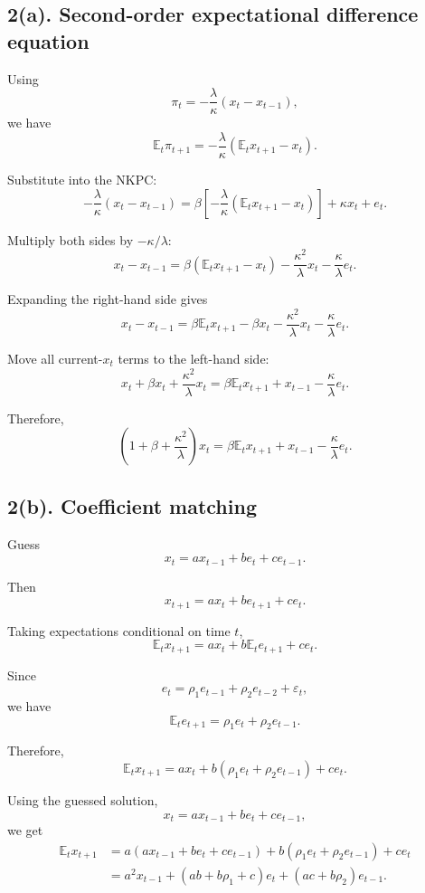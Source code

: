 \documentclass[12pt]{article}
\begin{document}
\subsection*{2(a). Second-order expectational difference equation}

Using
\[
\pi_t=-\frac{\lambda}{\kappa}(x_t-x_{t-1}),
\]
we have
\[
\mathbb{E}_t\pi_{t+1}
=
-\frac{\lambda}{\kappa}
\left(
\mathbb{E}_t x_{t+1}-x_t
\right).
\]

Substitute into the NKPC:
\[
-\frac{\lambda}{\kappa}(x_t-x_{t-1})
=
\beta
\left[
-\frac{\lambda}{\kappa}
\left(
\mathbb{E}_t x_{t+1}-x_t
\right)
\right]
+
\kappa x_t
+
e_t.
\]

Multiply both sides by $-\kappa/\lambda$:
\[
x_t-x_{t-1}
=
\beta
\left(
\mathbb{E}_t x_{t+1}-x_t
\right)
-
\frac{\kappa^2}{\lambda}x_t
-
\frac{\kappa}{\lambda}e_t.
\]

Expanding the right-hand side gives
\[
x_t-x_{t-1}
=
\beta\mathbb{E}_t x_{t+1}
-
\beta x_t
-
\frac{\kappa^2}{\lambda}x_t
-
\frac{\kappa}{\lambda}e_t.
\]

Move all current-$x_t$ terms to the left-hand side:
\[
x_t+\beta x_t+\frac{\kappa^2}{\lambda}x_t
=
\beta\mathbb{E}_t x_{t+1}
+
x_{t-1}
-
\frac{\kappa}{\lambda}e_t.
\]

Therefore,
\[
\boxed{
\left(
1+\beta+\frac{\kappa^2}{\lambda}
\right)x_t
=
\beta\mathbb{E}_t x_{t+1}
+
x_{t-1}
-
\frac{\kappa}{\lambda}e_t.
}
\]

\subsection*{2(b). Coefficient matching}

Guess
\[
x_t=a x_{t-1}+b e_t+c e_{t-1}.
\]

Then
\[
x_{t+1}
=
a x_t+b e_{t+1}+c e_t.
\]

Taking expectations conditional on time $t$,
\[
\mathbb{E}_t x_{t+1}
=
a x_t+b\mathbb{E}_t e_{t+1}+c e_t.
\]

Since
\[
e_t=\rho_1 e_{t-1}+\rho_2 e_{t-2}+\varepsilon_t,
\]
we have
\[
\mathbb{E}_t e_{t+1}
=
\rho_1 e_t+\rho_2 e_{t-1}.
\]

Therefore,
\[
\mathbb{E}_t x_{t+1}
=
a x_t
+
b(\rho_1 e_t+\rho_2 e_{t-1})
+
c e_t.
\]

Using the guessed solution,
\[
x_t=a x_{t-1}+b e_t+c e_{t-1},
\]
we get
\[
\begin{aligned}
\mathbb{E}_t x_{t+1}
&=
a(a x_{t-1}+b e_t+c e_{t-1})
+
b(\rho_1 e_t+\rho_2 e_{t-1})
+
c e_t \\
&=
a^2x_{t-1}
+
(ab+b\rho_1+c)e_t
+
(ac+b\rho_2)e_{t-1}.
\end{aligned}
\]
\end{document}
